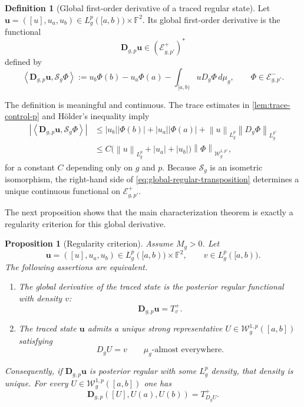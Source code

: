 \documentclass[preprint,12pt]{elsarticle}
\newtheorem{proposition}[theorem]{Proposition}
\theoremstyle{definition}
\newtheorem{definition}[theorem]{Definition}
\theoremstyle{remark}
\newcommand{\F}{\mathbb F}
\newcommand{\norm}[1]{\left\lVert#1\right\rVert}
\newcommand{\abs}[1]{\left\lvert#1\right\rvert}
\newcommand{\ip}[2]{\left\langle#1,#2\right\rangle}
\begin{document}
\begin{definition}[Global first-order derivative of a traced regular state]\label{def:global-regular-distributional-derivative}
Let $\mathbf u=([u],u_a,u_b)\in L_g^p([a,b))\times\F^2$. Its global first-order derivative is the functional
\[
 \mathbf D_{g,p}\mathbf u\in(\mathcal E_{g,p'}^+)^*
\]
defined by
\begin{equation}\label{eq:global-regular-transposition}
 \ip{\mathbf D_{g,p}\mathbf u}{\mathcal S_g\Phi}
 :=u_b\Phi(b)-u_a\Phi(a)
   -\int_{[a,b)}uD_g\Phi\,d\mu_g,
 \qquad \Phi\in\mathcal E_{g,p'}^-.
\end{equation}
\end{definition}

The definition is meaningful and continuous. The trace estimates in \cref{lem:trace-control-p} and H\"older's inequality imply
\[
 \begin{aligned}
 \abs{\ip{\mathbf D_{g,p}\mathbf u}{\mathcal S_g\Phi}}
 &\le \abs{u_b}\abs{\Phi(b)}+\abs{u_a}\abs{\Phi(a)}
      +\norm{u}_{L_g^p}\norm{D_g\Phi}_{L_g^{p'}}\\
 &\le C\bigl(\norm{u}_{L_g^p}+\abs{u_a}+\abs{u_b}\bigr)
      \norm{\Phi}_{\mathcal W_g^{1,p'}},
 \end{aligned}
\]
for a constant $C$ depending only on $g$ and $p$. Because $\mathcal S_g$ is an isometric isomorphism, the right-hand side of \eqref{eq:global-regular-transposition} determines a unique continuous functional on $\mathcal E_{g,p'}^+$.

The next proposition shows that the main characterization theorem is exactly a regularity criterion for this global derivative.

\begin{proposition}[Regularity criterion]\label{prop:regular-distributional-sector}
Assume $M_g>0$. Let
\[
 \mathbf u=([u],u_a,u_b)\in L_g^p([a,b))\times\F^2,
 \qquad v\in L_g^p([a,b)).
\]
The following assertions are equivalent.

\begin{enumerate}[label=\textup{(\roman*)}]
 \item The global derivative of the traced state is the posterior regular functional with density $v$:
 \[
  \mathbf D_{g,p}\mathbf u=T_v^+.
 \]
 \item The traced state $\mathbf u$ admits a unique strong representative $U\in\mathcal W_g^{1,p}([a,b])$ satisfying
 \[
  D_gU=v\qquad\mu_g\text{-almost everywhere}.
 \]
\end{enumerate}

Consequently, if $\mathbf D_{g,p}\mathbf u$ is posterior regular with some $L_g^p$ density, that density is unique. For every $U\in\mathcal W_g^{1,p}([a,b])$ one has
\begin{equation}\label{eq:regular-sector-compatibility}
 \mathbf D_{g,p}([U],U(a),U(b))=T_{D_gU}^+.
\end{equation}
\end{proposition}
\end{document}
